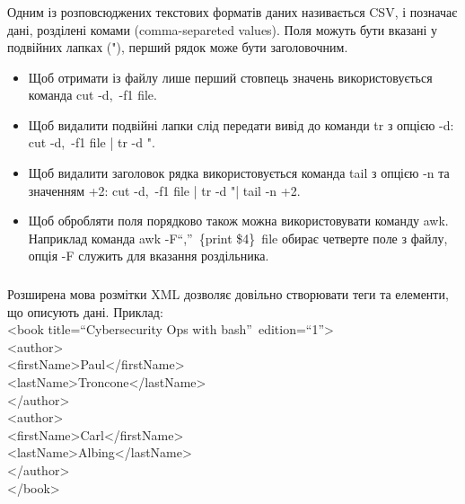 \documentclass[t]{beamer}  %
\begin{document}
\begin{frame}
	\frametitle{\insertsection} 
	\framesubtitle{\insertsubsection}	
Одним із розповсюджених текстових форматів даних називається CSV, і позначає дані, розділені комами (comma-separeted values). Поля можуть бути вказані у подвійних лапках ("), перший рядок може бути заголовочним.
\begin{itemize}
\item Щоб отримати із файлу лише перший стовпець значень використовується команда cut -d\textquotesingle,\textquotesingle~-f1 file.
\item Щоб видалити подвійні лапки слід передати вивід до команди tr з опцією -d: cut -d\textquotesingle,\textquotesingle~-f1 file | tr -d \textquotesingle"\textquotesingle . 
\item Щоб видалити заголовок рядка використовується команда tail з опцією -n та значенням +2: cut -d\textquotesingle,\textquotesingle~-f1 file | tr -d \textquotesingle"\textquotesingle | tail -n +2.
\item Щоб обробляти поля порядково також можна використовувати команду awk. Наприклад команда awk -F``,''~\textquotesingle \{print \$4\}\textquotesingle~file обирає четверте поле з файлу, опція -F служить для вказання роздільника.
\end{itemize}  
\end{frame}

\begin{frame}
	\frametitle{\insertsection} 
	\framesubtitle{\insertsubsection}	
Розширена мова розмітки XML дозволяє довільно створювати теги та елементи, що описують дані. Приклад:\\
<book title=``Cybersecurity Ops with bash''~edition=``1''>\\
\quad<author>\\
\quad\quad<firstName>Paul</firstName>\\
\quad\quad<lastName>Troncone</lastName>\\
\quad</author>\\
\quad<author>\\
\quad\quad<firstName>Carl</firstName>\\
\quad\quad<lastName>Albing</lastName>\\
\quad</author>\\
</book>
\end{frame}
\end{document}
